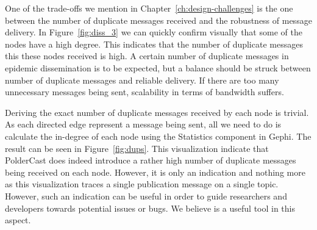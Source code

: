 One of the trade-offs we mention in Chapter~\ref{ch:design-challenges}
is the one between the number of duplicate messages received and the
robustness of message delivery. In Figure~\ref{fig:diss_3} we can
quickly confirm visually that some of the nodes have a high degree. This
indicates that the number of duplicate messages this these nodes
received is high. A certain number of duplicate messages in epidemic
dissemination is to be expected, but a balance should be struck between
number of duplicate messages and reliable delivery. If there are too
many unnecessary messages being sent, scalability in terms of bandwidth
suffers.

Deriving the exact number of duplicate messages received by each node is
trivial. As each directed edge represent  a message being sent, all we
need to do is calculate the in-degree of each node using the Statistics
component in Gephi. The result can be seen in Figure~\ref{fig:dups}.
This visualization indicate that PolderCast does indeed introduce a
rather high number of duplicate messages being received on each node.
However, it is only an indication and nothing more as this visualization
traces a single publication message on a single topic. However, such
an indication can be useful in order to guide researchers and developers
towards potential issues or bugs. We believe \demo is a useful tool in
this aspect.

